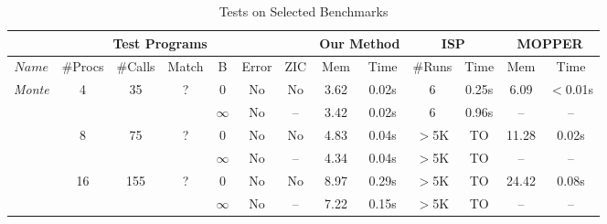 \begin{savenotes}
\begin{table*}[t]
\begin{center}
\scriptsize
\caption{Tests on Selected Benchmarks}\label{table:benchmarks}
     \begin{threeparttable}
\begin{tabular}{|c|c|c|c|c|c|c||c|c||c|c||c|c|}
		\hline
         \multicolumn{7}{|c||}{Test Programs} & \multicolumn{2}{c||}{Our Method} & \multicolumn{2}{c||}{ISP} & \multicolumn{2}{c|}{MOPPER}  \\ \hline
          $Name$ & \#Procs & \#Calls&Match&B&Error & ZIC &Mem & Time &\#Runs&Time & Mem & Time\\ \hline
          \multirow{6}{*}{\textit{Monte}} & \multirow{2}{*}{4} & \multirow{2}{*}{35} &  \multirow{2}{*}{?} 
          												     & 0 & No & No\tnote{\textdagger} & 3.62 & 0.02s & 6 & 0.25s & 6.09 & $<$0.01s\\ \cline{5-13}
          						       &                            & &  &  $\infty$ & No & -- & 3.42 & 0.02s & 6 & 0.96s &  -- & --\\ \cline{2-13}
						       		& \multirow{2}{*}{8} & \multirow{2}{*}{75} &  \multirow{2}{*}{?} 
          												     & 0 & No & No\tnote{\textdagger} & 4.83 & 0.04s & $>$5K & TO & 11.28 & 0.02s\\ \cline{5-13}
          						       &                            & &  &  $\infty$ & No & -- & 4.34 & 0.04s & $>$5K & TO &  -- & --\\ \cline{2-13}
						              & \multirow{2}{*}{16} & \multirow{2}{*}{155} &  \multirow{2}{*}{?} 
          												     & 0 & No & No\tnote{\textdagger} & 8.97 & 0.29s & $>$5K & TO & 24.42 & 0.08s\\ \cline{5-13}
          						       &                            & &  &  $\infty$ & No & -- & 7.22 & 0.15s & $>$5K & TO & --  & --\\ \hline
						       \hline
						       

\end{tabular}
\end{threeparttable}
\end{center}
\end{table*}
\end{savenotes}

